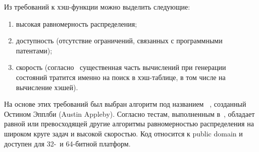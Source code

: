 Из требований к хэш-функции можно выделить следующие:
\begin{enumerate}
\item высокая равномерность распределения;
\item доступность (отсутствие ограничений, связанных с программными патентами);
\item скорость (согласно~\cite{LS99,BitHash1} существенная часть вычислений при генерации
  состояний тратится именно на поиск в хэш-таблице, в том числе на вычисление хэшей).
\end{enumerate}

На основе этих требований был выбран алгоритм под названием
~\cite{Murmur}, созданный Остином Эпплби (Austin Appleby). Согласно
тестам, выполненным в~\cite{Murmur},  обладает равной или превосходящей
другие алгоритмы равномерностью распределения на широком круге задач и высокой
скоростью. Код относится к public domain и доступен для 32-~и 64-битной платформ.

